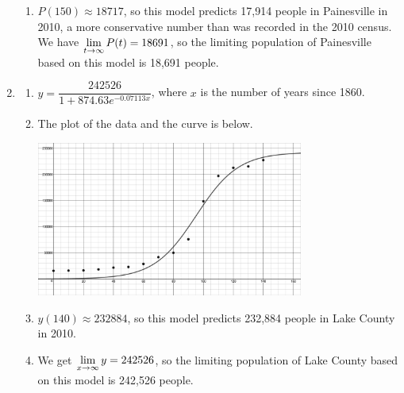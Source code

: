 \begin{enumerate}
\begin{enumerate}
\item $P(150) \approx 18717$, so this model predicts 17,914 people in Painesville in 2010, a more conservative number than was recorded in the 2010 census.  We have $\displaystyle{\lim_{t \rightarrow \infty} P(t) =  18691}$,  so the limiting population of Painesville based on this model is 18,691 people.

\enlargethispage{\baselineskip}

\end{enumerate}

\item \begin{enumerate}  \item  $y = \dfrac{242526}{1+874.63e^{-0.07113x}}$, where $x$ is the number of years since 1860.

\item  The plot of the data and the curve is below.

\centerline{\includegraphics[height=2in]{./ApplicationsofExponentialandLogarithmicFunctionsGraphics/LAKECOUNTYLOGISTIC.jpg}} 

\item  $y(140) \approx 232884$, so this model predicts 232,884 people in Lake County in 2010.

\item  We get $\displaystyle{\lim_{x \rightarrow \infty} y = 242526}$, so the limiting population of Lake County based on this model is 242,526 people.

\end{enumerate}

\end{enumerate}
